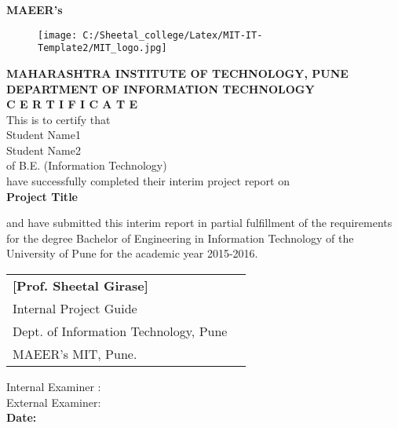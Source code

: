 
\begin{center}
{\bf MAEER's}
\begin{figure}[h]
	\centering
		\texttt{[image: C:/Sheetal\_college/Latex/MIT-IT-Template2/MIT\_logo.jpg]}
	\label{fig:mit}
\end{figure}

{\bf MAHARASHTRA INSTITUTE OF TECHNOLOGY, PUNE}\\
{\bf DEPARTMENT OF INFORMATION TECHNOLOGY}\\

{\large {\bf C E R T I F I C A T E} \\}
\vspace{0.3in}%
{\large This is to certify that } \\
{Student Name1 } \\
{Student Name2 } \\
{of B.E. (Information Technology)}\\
{have successfully completed their interim project report on }\\

{\large {\bf Project Title\\}}
\vspace{0.2in}%
\end{center}
{ and have submitted this interim report in partial fulfillment of the requirements for the degree Bachelor of Engineering in Information Technology of 
the University of Pune for the academic year 2015-2016.\\}






\begin{tabular}{ll}
{\bf[Prof. Sheetal Girase]} & \hspace{0.25in}{\bf[Dr.Debajyoti Mukhopadhyay]}\\
{Internal Project Guide} & \hspace{0.26in}{Dean (R\&D) of MIT group \& Head of,}\\
{Dept. of Information Technology, Pune} & \hspace{0.24in}{Dept. of Information Technology, Pune.}\\
{MAEER's MIT, Pune.}& \hspace{0.25in}{MAEER's MIT, Pune.}		
\end{tabular}



\vspace{0.3in}\noindent
Internal Examiner :\underline{\hspace{2.0in}}\\
External Examiner:\underline{\hspace{2.0in}}\\
{\bf Date:}

